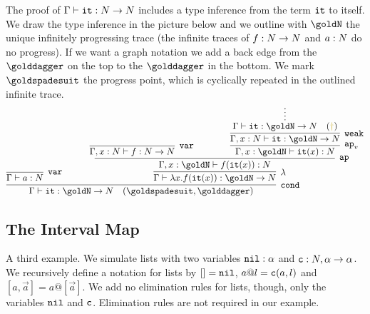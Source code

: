 The proof of $\Gamma \vdash {\tt it}: {N} \rightarrow {N}$ 
includes a type inference from the term ${\tt it}$ to itself.
We draw the type inference in the picture below and we outline
with $\goldN$ the unique infinitely progressing trace
(the infinite traces of $f:{N} \rightarrow {N}$ and $a:{N}$ do no progress). 
If we want a graph notation we add a back edge from the 
$\golddagger$ on the top to the $\golddagger$ in the bottom.
We mark $\goldspadesuit$ the progress point, which is cyclically repeated in 
the outlined infinite trace. 
\[
{
    \infer[\cond]{ %
      \Gamma 
      \vdash \iter: \goldN \rightarrow \N 
        \quad (\goldspadesuit, \golddagger)
     }{ 
         \infer[\var]{
       \Gamma 
      \vdash a:\N}{}
     &
        {\ \ \ \ \ \ }
        {\infer[\lambda] %
         {
         \Gamma
          \vdash \lambda x.f(\iter(x)):\goldN \rightarrow \N
         }{
         \infer[\ap]{ %
           \Gamma, x:\goldN
          \vdash f(\iter(x)):\N
           }{
          \infer[\var]{
       \Gamma, x:\N 
      \vdash f:\N \rightarrow \N}{}
           {\ \ \ \ \ \ \ \ \ \ \ \ }
           {\infer[\apvar] %
            {\Gamma, x:\goldN
        \vdash \iter(x): \N 
             }{
          \infer[\weak]{\Gamma, x:\N
                                 \vdash \iter: \goldN \rightarrow \N}
                                {\infer*{\Gamma
                                 \vdash \iter: \goldN \rightarrow \N
                                  \ \ \ (\bfColor{oldgold}{ \dagger})}{}
             }
           }
          }
        }%
      }%
    }%
   }%
 }%
\]




\subsection{The Interval Map}
A third example. We simulate lists with two variables ${\tt nil}:\alpha$ and 
${\tt c}:{N},\alpha \rightarrow \alpha$. We recursively define a notation for lists by $[]={\tt nil}$,
$a @ l={\tt c}(a,l)$ and $[a,\vec{a}] = a @ [\vec{a}]$. We add no elimination rules 
for lists, though, only the variables ${\tt nil}$ and ${\tt c}$. Elimination rules are not 
required in our example.

